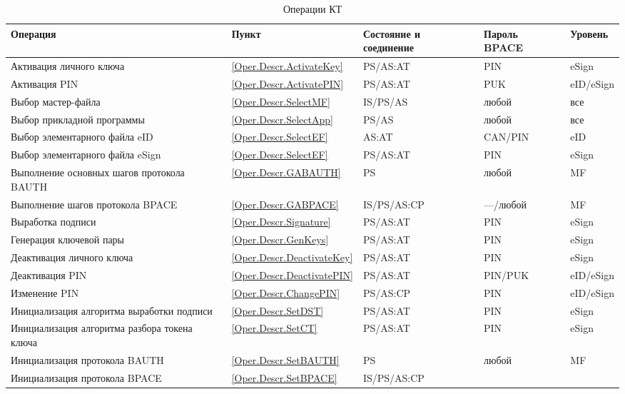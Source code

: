 \begin{table}[p]
\caption{Операции КТ}
\label{Table.Oper.List}
\begin{tabular}{|p{7.5cm}|p{1.3cm}|p{2.6cm}|p{1.8cm}| p{1.7cm}|}
\hline
Операция & Пункт & Состояние и соединение & Пароль BPACE & Уровень \\
\hline
\hline
Активация личного ключа & \ref{Oper.Descr.ActivateKey} & PS/AS:AT & PIN & eSign\\ 
\hline
Активация PIN & \ref{Oper.Descr.ActivatePIN} & PS/AS:AT & PUK & eID/eSign\\
\hline
Выбор мастер-файла & \ref{Oper.Descr.SelectMF} & IS/PS/AS & любой & все \\
\hline
Выбор прикладной программы & \ref{Oper.Descr.SelectApp} & PS/AS & любой & все\\ 
\hline
Выбор элементарного файла eID & \ref{Oper.Descr.SelectEF} & AS:AT & CAN/PIN & 
eID \\ 
\hline
Выбор элементарного файла eSign & \ref{Oper.Descr.SelectEF} & PS/AS:AT & PIN & 
eSign \\ 
\hline
Выполнение основных шагов протокола BAUTH & \ref{Oper.Descr.GABAUTH} & PS & 
любой & MF \\ 
\hline
Выполнение шагов протокола BPACE & \ref{Oper.Descr.GABPACE} & IS/PS/AS:CP & 
---/любой & MF \\ 
\hline
Выработка подписи & \ref{Oper.Descr.Signature} & PS/AS:AT & PIN & eSign \\
\hline
Генерация ключевой пары & \ref{Oper.Descr.GenKeys} & PS/AS:AT & PIN & eSign \\
\hline
Деактивация личного ключа & \ref{Oper.Descr.DeactivateKey}  & PS/AS:AT & PIN & 
eSign\\ 
\hline
Деактивация PIN & \ref{Oper.Descr.DeactivatePIN}  & PS/AS:AT & PIN/PUK & 
eID/eSign\\ 
\hline
Изменение PIN & \ref{Oper.Descr.ChangePIN} & PS/AS:CP & PIN & eID/eSign \\
\hline
Инициализация алгоритма выработки подписи & \ref{Oper.Descr.SetDST} & PS/AS:AT 
& PIN & eSign \\ 
\hline
Инициализация алгоритма разбора токена ключа & \ref{Oper.Descr.SetCT} & 
PS/AS:AT & PIN & eSign \\ 
\hline
Инициализация протокола BAUTH & \ref{Oper.Descr.SetBAUTH} & PS & любой & MF \\ 
\hline
Инициализация протокола BPACE & \ref{Oper.Descr.SetBPACE} & IS/PS/AS:CP & 

\end{tabular}
\end{table}
